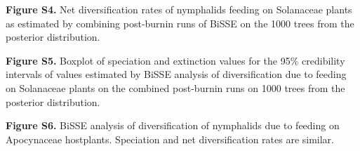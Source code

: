 \documentclass[10pt]{article}
\begin{document}
\begin{description}
 \item {\bf Figure S4.} Net diversification rates of nymphalids feeding on
Solanaceae plants as estimated by combining post-burnin runs of BiSSE on
the 1000 trees from the posterior distribution.

 \item {\bf Figure S5.} Boxplot of speciation and extinction values for the
95\% credibility intervals of values estimated by BiSSE analysis of
diversification due to feeding on Solanaceae plants on the combined
post-burnin runs on 1000 trees from the posterior distribution.

 \item {\bf Figure S6.} BiSSE analysis of diversification of nymphalids due
to feeding on Apocynaceae hostplants. Speciation and net diversification
rates are similar.
\end{description}



{}




\end{document}
